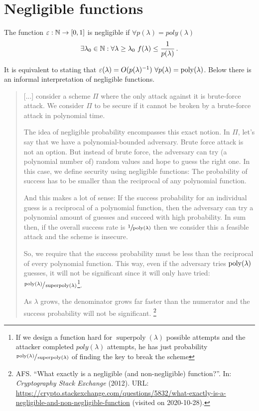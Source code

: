 \section{Negligible functions}
\begin{definition}
	The function $\varepsilon : \mathbb{N} \to [0,1]$ is negligible if $\forall p(\lambda) = poly(\lambda)$
	\[
		\exists \lambda_0 \in \mathbb{N} : \forall \lambda \geq \lambda_0 \ f(\lambda) \leq \frac{1}{p(\lambda)} \, .
	\]
\end{definition}
%
\noindent It is equivalent to stating that $\varepsilon(\lambda) = O(p(\lambda)^{-1}) \ \forall p(\lambda) = \mathrm{poly}(\lambda)$.
Below there is an informal interpretation of negligible functions.
%
\begin{quotation}
	[...] consider a scheme $\Pi$ where the only attack against it is brute-force attack.
	We consider $\Pi$ to be secure if it cannot be broken by a brute-force attack in polynomial time.
	
	The idea of negligible probability encompasses this exact notion.
	In $\Pi$, let's say that we have a polynomial-bounded adversary.
	Brute force attack is not an option.
	But instead of brute force, the adversary can try (a polynomial number of) random values and hope to guess the right one.
	In this case, we define security using negligible functions: The probability of success has to be smaller than the reciprocal of any polynomial function.
	
	And this makes a lot of sense: If the success probability for an individual guess is a reciprocal of a polynomial function, then the adversary can try a polynomial amount of guesses and succeed with high probability.
	In sum then, if the overall success rate is $\sfrac{1}{\mathrm{poly}(\lambda)}$ then we consider this a feasible attack and the scheme is insecure.
	
	So, we require that the success probability must be less than the reciprocal of every polynomial function.
	This way, even if the adversary tries $\mathrm{poly}(\lambda)$ guesses, it will not be significant since it will only have tried: $\sfrac{\mathrm{poly}(\lambda)}{\operatorname{superpoly}(\lambda)}$\footnote{If we design a function hard for $\operatorname{superpoly}(\lambda)$ possible attempts and the attacker completed $poly(\lambda)$ attempts, he has just probability $\sfrac{\mathrm{poly}(\lambda)}{\operatorname{superpoly}(\lambda)} $ of finding the key to break the scheme}.
	
	As $\lambda$ grows, the denominator grows far faster than the numerator and the success probability will not be significant.
	\footnote{
		AFS. ``What exactly is a negligible (and non-negligible) function?''.
		In: \emph{Cryptography Stack Exchange} (2012).
		URL: \url{https://crypto.stackexchange.com/questions/5832/what-exactly-is-a-negligible-and-non-negligible-function} (visited on 2020-10-28).
	}
\end{quotation}

